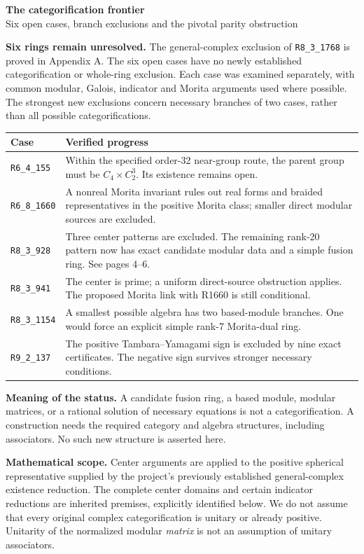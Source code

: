 \documentclass[11pt,a4paper]{article}
\newcommand{\R}[1]{\texttt{#1}}
\begin{document}
{\color{ink}\LARGE\bfseries The categorification frontier}\\[5pt]
{\large Six open cases, branch exclusions and the pivotal parity obstruction}

\textbf{Six rings remain unresolved.} The general-complex exclusion of \R{R8\_3\_1768} is proved in Appendix A. The six open cases have no newly established categorification or whole-ring exclusion. Each case was examined separately, with common modular, Galois, indicator and Morita arguments used where possible. The strongest new exclusions concern necessary branches of two cases, rather than all possible categorifications.

\begin{center}
\renewcommand{\arraystretch}{1.18}
\begin{tabular}{@{}lp{10.9cm}@{}}
\toprule
Case & Verified progress\\
\midrule
\R{R6\_4\_155} & Within the specified order-32 near-group route, the parent group must be $C_4\times C_2^3$. Its existence remains open.\\
\R{R6\_8\_1660} & A nonreal Morita invariant rules out real forms and braided representatives in the positive Morita class; smaller direct modular sources are excluded.\\
\R{R8\_3\_928} & Three center patterns are excluded. The remaining rank-20 pattern now has exact candidate modular data and a simple fusion ring. See pages 4--6.\\
\R{R8\_3\_941} & The center is prime; a uniform direct-source obstruction applies. The proposed Morita link with R1660 is still conditional.\\
\R{R8\_3\_1154} & A smallest possible algebra has two based-module branches. One would force an explicit simple rank-7 Morita-dual ring.\\
\R{R9\_2\_137} & The positive Tambara--Yamagami sign is excluded by nine exact certificates. The negative sign survives stronger necessary conditions.\\
\bottomrule
\end{tabular}
\end{center}

\textbf{Meaning of the status.} A candidate fusion ring, a based module, modular matrices, or a rational solution of necessary equations is not a categorification. A construction needs the required category and algebra structures, including associators. No such new structure is asserted here.

\textbf{Mathematical scope.} Center arguments are applied to the positive spherical representative supplied by the project's previously established general-complex existence reduction. The complete center domains and certain indicator reductions are inherited premises, explicitly identified below. We do not assume that every original complex categorification is unitary or already positive. Unitarity of the normalized modular \emph{matrix} is not an assumption of unitary associators.
\end{document}
